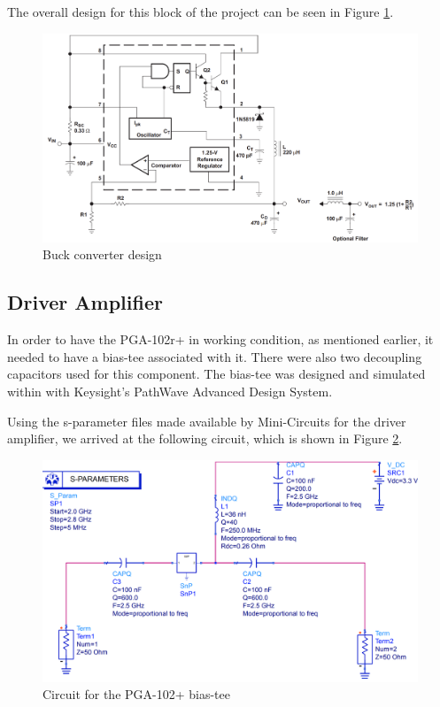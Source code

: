 \par The overall design for this block of the project can be seen in Figure \ref{fig:ch3_BuckConf.png}.

\begin{figure}[H]
    \vspace*{0cm}
    \centering
    \includegraphics[width=0.9\linewidth]{figs/ch3_BuckConf.png}
    \caption{Buck converter design \cite{2004MC3x063ARegulators}}
    \label{fig:ch3_BuckConf.png}
\end{figure}

\subsection{Driver Amplifier}
\par In order to have the PGA-102r+ in working condition, as mentioned earlier, it needed to have a bias-tee associated with it. There were also two decoupling capacitors used for this component. The bias-tee was designed and simulated within with Keysight's PathWave Advanced Design System.

\par Using the s-parameter files made available by Mini-Circuits for the driver amplifier, we arrived at the following circuit, which is shown in Figure \ref{fig:ch3_PGAbiastee.png}.

\begin{figure}[H]
    \vspace*{0cm}
    \centering
    \includegraphics[width=0.9\linewidth]{figs/ch3_PGAbiastee.png}
    \caption{Circuit for the PGA-102+ bias-tee}
    \label{fig:ch3_PGAbiastee.png}
\end{figure}

